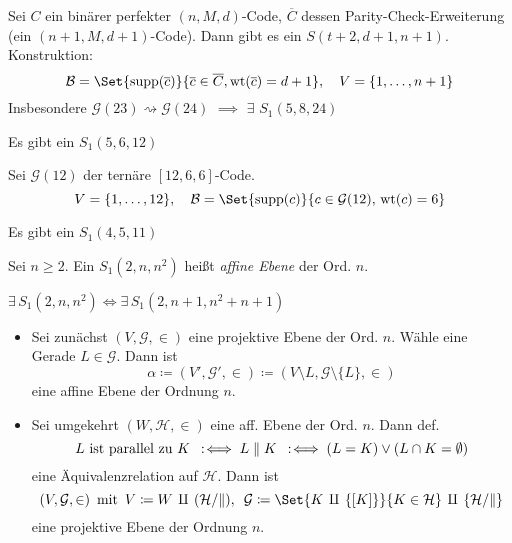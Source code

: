 \documentclass{cheat-sheet}
\DeclareMathOperator{\wt}{wt} %
\newcommand{\Golay}{\mathcal{G}} %
\newcommand{\Blocks}{\mathcal{B}} %
\newcommand{\Geraden}{\mathcal{G}} %
\begin{document}
\begin{bem}
  Sei $C$ ein binärer perfekter $(n, M, d)$-Code, $\overline{C}$ dessen Parity-Check-Erweiterung (ein $(n+1, M, d+1)$-Code).
  Dann gibt es ein $S(t+2, d+1, n+1)$.
  Konstruktion:
  \[
    \Blocks = \Set{\supp(\overline{c})}{\overline{c} \in \overline{C}, \wt(\overline{c}) = d+1}, \quad
    V = \{ 1, \ldots, n+1 \}
  \]
  Insbesondere $\Golay(23) \rightsquigarrow \Golay(24)$ $\implies$ $\exists$ $S_1(5, 8, 24)$
\end{bem}

\begin{satz}
  Es gibt ein $S_1(5, 6, 12)$
\end{satz}

\begin{konstr}
  Sei $\Golay(12)$ der ternäre $[12,6,6]$-Code.
  \[
    V = \{ 1, \ldots, 12 \}, \quad
    \Blocks = \Set{\supp(c)}{c \in \Golay(12), \, \wt(c) = 6}
  \]
\end{konstr}

\begin{satz}
  Es gibt ein $S_1(4, 5, 11)$
\end{satz}


\begin{defn}
  Sei $n \geq 2$.
  Ein $S_1(2, n, n^2)$ heißt \emph{affine Ebene} der Ord. $n$.
\end{defn}

\begin{satz}
  $\exists \, S_1(2, n, n^2) \iff \exists \, S_1(2, n+1, n^2 + n + 1)$
\end{satz}

\begin{konstr}
  \begin{itemize}
    \item Sei zunächst $(V, \Geraden, \in)$ eine projektive Ebene der Ord. $n$.
    Wähle eine Gerade $L \in \Geraden$.
    Dann ist
    \[ \alpha \coloneqq (V', \Geraden', \in) \coloneqq (V \setminus L, \Geraden \setminus \{ L \}, \in) \]
    eine affine Ebene der Ordnung $n$. \\
    \item Sei umgekehrt $(W, \mathcal{H}, \in)$ eine aff. Ebene der Ord. $n$.
    Dann def.
    \[ L \text{ ist parallel zu } K \enspace:\!\iff L \parallel K \enspace:\!\iff (L = K) \vee (L \cap K = \emptyset) \]
    eine Äquivalenzrelation auf $\mathcal{H}$.
    Dann ist
    \[
      (V, \Geraden, \in)
      \enspace \text{mit} \enspace
      V \coloneqq W \,\amalg\, (\mathcal{H}/{\parallel}), \enspace
      \Geraden \coloneqq \Set{K \,\amalg\, \{ [K] \}}{K \in \mathcal{H}} \,\amalg\, \{ \mathcal{H}/{\parallel} \}
    \]
    eine projektive Ebene der Ordnung $n$.
  \end{itemize}
\end{konstr}
\end{document}
